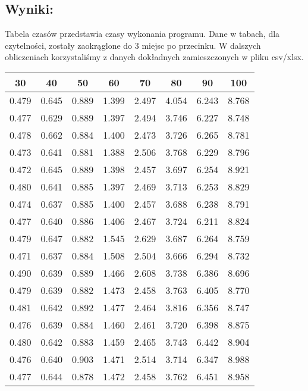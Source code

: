 \subsection{Wyniki: }
Tabela czasów przedstawia czasy wykonania programu. Dane w tabach, dla czytelności, zostały zaokrąglone do 3 miejsc po przecinku. W dalszych obliczeniach korzystaliśmy z danych dokładnych zamieszczonych w pliku csv/xlsx.
\begin{table}[H]
  \centering
  \begin{tabular}{|c|c|c|c|c|c|c|c|}
  \hline
      30 & 40 & 50 & 60 & 70 & 80 & 90 & 100 \\ \hline \hline
      0.479 & 0.645 & 0.889 & 1.399 & 2.497 & 4.054 & 6.243 & 8.768 \\ \hline
      0.477 & 0.629 & 0.889 & 1.397 & 2.494 & 3.746 & 6.227 & 8.748 \\ \hline
      0.478 & 0.662 & 0.884 & 1.400 & 2.473 & 3.726 & 6.265 & 8.781 \\ \hline
      0.473 & 0.641 & 0.881 & 1.388 & 2.506 & 3.768 & 6.229 & 8.796 \\ \hline
      0.472 & 0.645 & 0.889 & 1.398 & 2.457 & 3.697 & 6.254 & 8.921 \\ \hline
      0.480 & 0.641 & 0.885 & 1.397 & 2.469 & 3.713 & 6.253 & 8.829 \\ \hline
      0.474 & 0.637 & 0.885 & 1.400 & 2.457 & 3.688 & 6.238 & 8.791 \\ \hline
      0.477 & 0.640 & 0.886 & 1.406 & 2.467 & 3.724 & 6.211 & 8.824 \\ \hline
      0.479 & 0.647 & 0.882 & 1.545 & 2.629 & 3.687 & 6.264 & 8.759 \\ \hline
      0.471 & 0.637 & 0.884 & 1.508 & 2.504 & 3.666 & 6.294 & 8.732 \\ \hline
      0.490 & 0.639 & 0.889 & 1.466 & 2.608 & 3.738 & 6.386 & 8.696 \\ \hline
      0.479 & 0.639 & 0.882 & 1.473 & 2.458 & 3.763 & 6.405 & 8.770 \\ \hline
      0.481 & 0.642 & 0.892 & 1.477 & 2.464 & 3.816 & 6.356 & 8.747 \\ \hline
      0.476 & 0.639 & 0.884 & 1.460 & 2.461 & 3.720 & 6.398 & 8.875 \\ \hline
      0.480 & 0.642 & 0.883 & 1.459 & 2.465 & 3.743 & 6.442 & 8.904 \\ \hline
      0.476 & 0.640 & 0.903 & 1.471 & 2.514 & 3.714 & 6.347 & 8.988 \\ \hline
      0.477 & 0.644 & 0.878 & 1.472 & 2.458 & 3.762 & 6.451 & 8.958 \\ \hline

\end{tabular}
\end{table}
